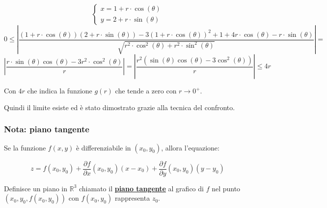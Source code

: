 \documentclass[a4paper]{article}
\begin{document}
	\begin{equation*}
		\begin{cases}
			x = 1 + r \cdot \cos\left(\theta\right) \\
			y = 2 + r \cdot \sin\left(\theta\right)
		\end{cases}
	\end{equation*}
	\vspace{1em}
	\begin{equation*}
		0 \le \left|\dfrac{\left(1 + r \cdot \cos\left(\theta\right)\right)\left(2 + r\cdot\sin\left(\theta\right)\right) - 3\left(1 + r\cdot\cos\left(\theta\right)\right)^{2} + 1 + 4 r \cdot \cos\left(\theta\right) - r \cdot \sin\left(\theta\right)}{\sqrt{r^{2} \cdot \cos^{2}\left(\theta\right) + r^{2} \cdot \sin^{2}\left(\theta\right)}}\right| =
	\end{equation*}
	\vspace{1em}
	\begin{equation*}
		\left|\dfrac{r \cdot \sin\left(\theta\right)\cos\left(\theta\right) - 3 r^{2} \cdot \cos^{2}\left(\theta\right)}{r}\right| = \left|\dfrac{r^{2}\left(\sin\left(\theta\right)\cos\left(\theta\right) - 3\cos^{2}\left(\theta\right)\right)}{r}\right| \le 4r
	\end{equation*}

	\noindent
	Con $4r$ che indica la funzione $g\left(r\right)$ che tende a zero con $r \rightarrow 0^{+}$.\newline
	
	\noindent
	Quindi il limite esiste ed è stato dimostrato grazie alla tecnica del confronto.
	
	\subsubsection[Nota: piano tangente]{\textcolor{Red3}{Nota: piano tangente}}
	
	Se la funzione $f\left(x,y\right)$ è differenziabile in $\left(x_{0}, y_{0}\right)$, allora l'equazione:
	
	\begin{equation*}
		z = f\left(x_{0}, y_{0}\right) + \dfrac{\partial f}{\partial x}\left(x_{0},y_{0}\right)\left(x-x_{0}\right) + \dfrac{\partial f}{\partial y}\left(x_{0},y_{0}\right)\left(y-y_{0}\right)
	\end{equation*}

	\noindent
	Definisce un piano in $\mathbb{R}^{3}$ chiamato il \textcolor{Red3}{\textbf{\underline{piano tangente}}} al grafico di $f$ nel punto $\left(x_{0},y_{0},f\left(x_{0},y_{0}\right)\right)$ con $f\left(x_{0},y_{0}\right)$ rappresenta $z_{0}$.
	
\end{document}
